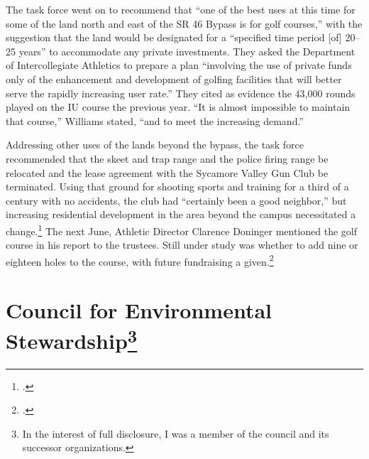 \documentclass[
  american,
  letterpaper,
]{scrreprt}
\begin{document}
The task force went on to recommend that ``one of the best uses at this
time for some of the land north and east of the SR 46 Bypass is for golf
courses,'' with the suggestion that the land would be designated for a
``specified time period {[}of{]} 20--25 years'' to accommodate any
private investments. They asked the Department of Intercollegiate
Athletics to prepare a plan ``involving the use of private funds only of
the enhancement and development of golfing facilities that will better
serve the rapidly increasing user rate.'' They cited as evidence the
43,000 rounds played on the IU course the previous year. ``It is almost
impossible to maintain that course,'' Williams stated, ``and to meet the
increasing demand.''

Addressing other uses of the lands beyond the bypass, the task force
recommended that the skeet and trap range and the police firing range be
relocated and the lease agreement with the Sycamore Valley Gun Club be
terminated. Using that ground for shooting sports and training for a
third of a century with no accidents, the club had ``certainly been a
good neighbor,'' but increasing residential development in the area
beyond the campus necessitated a change.\footnote{.}
The next June, Athletic Director Clarence Doninger mentioned the golf
course in his report to the trustees. Still under study was whether to
add nine or eighteen holes to the course, with future fundraising a
given.\footnote{.}

\section[Council for Environmental Stewardship]{\texorpdfstring{Council
for Environmental
Stewardship\footnote{In the interest of full disclosure, I was a member
  of the council and its successor organizations.}}{Council for Environmental Stewardship}}\label{council-for-environmental-stewardship}
\end{document}
